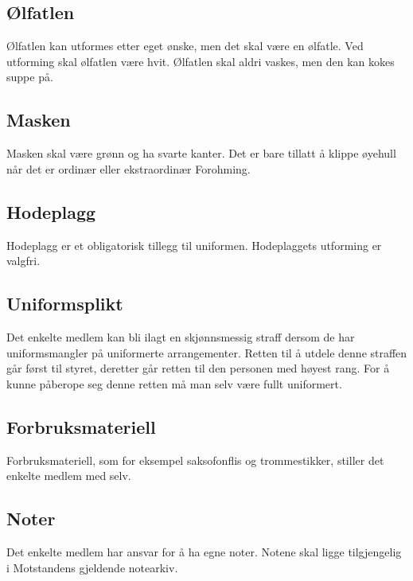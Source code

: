     \subsection{Ølfatlen}
        \begin{statute}
            Ølfatlen kan utformes etter eget ønske, men det skal være en ølfatle. Ved utforming skal ølfatlen være hvit. Ølfatlen skal aldri vaskes, men den kan kokes suppe på.
        \end{statute}
        
    \subsection{Masken}
        \begin{statute}
            Masken skal være grønn og ha svarte kanter. Det er bare tillatt å klippe øyehull når det er ordinær eller ekstraordinær Forohming.
        \end{statute}
        
    \subsection{Hodeplagg}
        \begin{statute}
            Hodeplagg er et obligatorisk tillegg til uniformen. Hodeplaggets utforming er valgfri.
        \end{statute}

    \subsection{Uniformsplikt}
        \begin{statute}
            Det enkelte medlem kan bli ilagt en skjønnsmessig straff dersom de har uniformsmangler på uniformerte arrangementer. Retten til å utdele denne straffen går først til styret, deretter går retten til den personen med høyest rang. For å kunne påberope seg denne retten må man selv være fullt uniformert.
        \end{statute}
        
    \subsection{Forbruksmateriell}
        \begin{statute}
            Forbruksmateriell, som for eksempel saksofonflis og trommestikker, stiller det enkelte medlem med selv.
        \end{statute}
        
    \subsection{Noter}
        \begin{statute}
            Det enkelte medlem har ansvar for å ha egne noter. Notene skal ligge tilgjengelig i Motstandens gjeldende notearkiv.
        \end{statute}
     